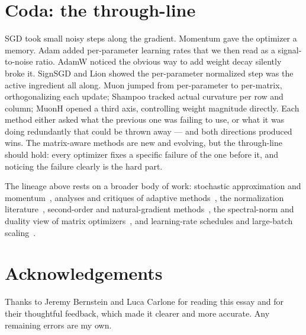\documentclass[10pt,conference]{IEEEtran}
\begin{document}
\section{Coda: the through-line}
SGD took small noisy steps along the gradient. Momentum gave the optimizer a
memory. Adam added per-parameter learning rates that we then read as a
signal-to-noise ratio. AdamW noticed the obvious way to add weight decay silently
broke it. SignSGD and Lion showed the per-parameter normalized step was the active
ingredient all along. Muon jumped from per-parameter to per-matrix,
orthogonalizing each update; Shampoo tracked actual curvature per row and column;
MuonH opened a third axis, controlling weight magnitude directly. Each method
either asked what the previous one was failing to use, or what it was doing
redundantly that could be thrown away --- and both directions produced wins. The
matrix-aware methods are new and evolving, but the through-line should hold: every
optimizer fixes a specific failure of the one before it, and noticing the failure
clearly is the hard part.

The lineage above rests on a broader body of work: stochastic approximation and momentum~\cite{ref16,ref17,ref18,ref19}, analyses and critiques of adaptive methods~\cite{ref20,ref21}, the normalization literature~\cite{ref22,ref23,ref24,ref25,ref26}, second-order and natural-gradient methods~\cite{ref27,ref28,ref29}, the spectral-norm and duality view of matrix optimizers~\cite{ref30,ref31,ref32}, and learning-rate schedules and large-batch scaling~\cite{ref33,ref34,ref35}.

\section*{Acknowledgements}
Thanks to Jeremy Bernstein and Luca Carlone for reading this essay and for their
thoughtful feedback, which made it clearer and more accurate. Any remaining errors
are my own.
\end{document}
